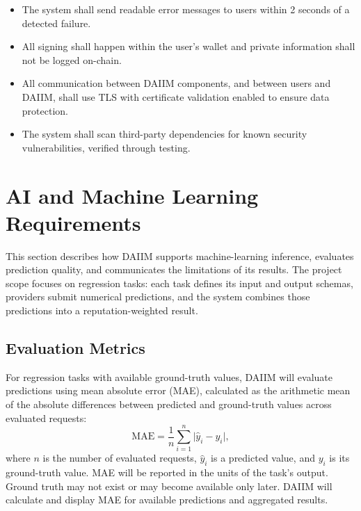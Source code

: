 \documentclass[12pt]{article}
\newcounter{nfrnum} %
\newcounter{snfrnum} %
\renewcommand{\thesnfrnum}{NFR.SA.\arabic{snfrnum}}
\begin{document}
\noindent \begin{itemize}

\item[\refstepcounter{snfrnum}\thesnfrnum \label{SA_ErrorMessageTime}:] The system shall send readable error messages to users within 2 seconds of a detected failure.

\item[\refstepcounter{snfrnum}\thesnfrnum \label{SA_WalletSigning}:] All signing shall happen within the user's wallet and private information shall not be logged on-chain.

\item[\refstepcounter{snfrnum}\thesnfrnum \label{SA_TLS}:] All communication between DAIIM components, and between users and DAIIM, shall use TLS with certificate validation enabled to ensure data protection.

\item[\refstepcounter{snfrnum}\thesnfrnum \label{SA_DependencyScan}:] The system shall scan third-party dependencies for known security vulnerabilities, verified through testing.

\end{itemize}


\section{AI and Machine Learning Requirements}

This section describes how DAIIM supports machine-learning inference, evaluates
prediction quality, and communicates the limitations of its results. The
project scope focuses on regression tasks: each task defines its input and
output schemas, providers submit numerical predictions, and the system combines
those predictions into a reputation-weighted result.

\subsection{Evaluation Metrics}

For regression tasks with available ground-truth values, DAIIM will evaluate
predictions using mean absolute error (MAE), calculated as the arithmetic mean
of the absolute differences between predicted and ground-truth values across
evaluated requests:
\[
\mathrm{MAE} = \frac{1}{n}\sum_{i=1}^{n} \lvert \hat{y}_i - y_i \rvert,
\]
where $n$ is the number of evaluated requests, $\hat{y}_i$ is a predicted
value, and $y_i$ is its ground-truth value. MAE will be reported in the units
of the task's output. Ground truth may not exist or may become available only
later. DAIIM will calculate and display MAE for available
predictions and aggregated results.
\end{document}
